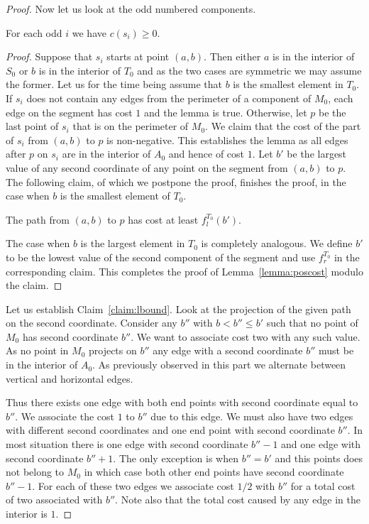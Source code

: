 \documentclass{article}\usepackage[a4paper,margin=20mm]{geometry}
\begin{document}
\begin{proof}
Now let us look at the odd numbered components.
\begin{lemma}\label{lemma:poscost}
For each odd $i$ we have $c(s_i) \geq  0$.
\end{lemma}

\begin{proof}
Suppose that $s_i$
starts at point $(a,b)$.  Then either $a$ is in the interior
of $S_0$ or $b$ is in the interior of $T_0$ and as the two 
cases are symmetric we may assume the former.
Let us for the time being assume that $b$ is the smallest
element in $T_0$.   If $s_i$
does not contain any edges from the perimeter of a
component of $M_0$, each edge on the segment has
cost $1$ and the lemma is true.  Otherwise, let $p$ be the last
point of $s_i$ that is on the perimeter of $M_0$.   We claim that the
cost of the part of $s_i$ from $(a,b)$ to $p$ is non-negative.
This establishes the lemma as all
edges after $p$ on $s_i$ are in the interior of $A_0$ and
hence of cost $1$.
Let $b'$ be the largest value of any second coordinate 
of any point on
the segment from $(a,b)$ to $p$.  The following
claim, of which we postpone the proof, finishes the proof,
in the case when $b$ is the smallest element of $T_0$.
\begin{claim}\label{claim:lbound}
The path from $(a,b)$ to $p$ has cost at least $f_l^{T_0} (b')$.
\end{claim}
The case when $b$ is the largest element in $T_0$ is completely
analogous.  We define $b'$ to be the lowest value of the
second component of the segment and use $f_r^{T_0}$ 
in the corresponding claim.  This completes the proof
of Lemma~\ref{lemma:poscost} modulo the claim.
\end{proof}

Let us establish Claim~\ref{claim:lbound}.  Look at the projection
of the given path on the second coordinate.  Consider any $b''$
with $b <b'' \leq b'$ such that no point of $M_0$ has second
coordinate $b''$.  We want to associate cost two with any
such value.
As no point in $M_0$ projects on $b''$ any edge with
a second coordinate $b''$ must be in the interior of $A_0$.
As previously observed in this part we alternate
between vertical and horizontal edges.

Thus there exists one edge with both end points with
second coordinate equal to $b''$.  We associate the
cost $1$ to $b''$ due to this edge.  We must also have
two edges with different second coordinates
and one end point with second coordinate $b''$.
In most situation there is one edge with second coordinate
$b''-1$ and one edge with second coordinate $b''+1$.
The only exception is when $b''=b'$ and this points
does not belong to $M_0$ in which case both other
end points have second coordinate $b''-1$.
For each of these two edges we associate cost $1/2$ with
$b''$ for a total cost of two associated with   $b''$.
Note also that the total cost caused by any edge
in the interior is $1$.


\end{proof}
\end{document}
